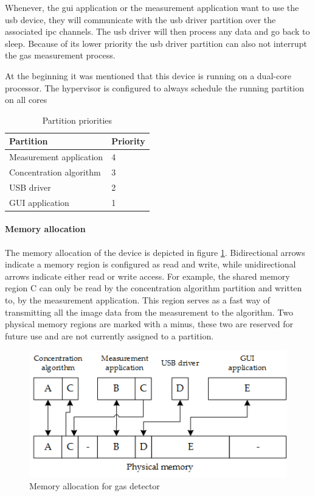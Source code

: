 Whenever, the \acrshort{gui} application or the measurement application want to use the \acrshort{usb} device, they will communicate with the \acrshort{usb} driver partition over the associated \acrshort{ipc} channels. The \acrshort{usb} driver will then process any data and go back to sleep. Because of its lower priority the \acrshort{usb} driver partition can also not interrupt the gas measurement process.

At the beginning it was mentioned that this device is running on a dual-core processor. The hypervisor is configured to always schedule the running partition on all cores 

\begin{table}[h!]
\centering
\begin{tabular}{l|l}
\textbf{Partition} & \textbf{Priority} \\ \hline
Measurement application                               & 4                                           \\ \hline
Concentration algorithm                                & 3                                           \\ \hline
USB driver                                  & 2                                           \\ \hline
GUI application                    & 1                                          
\end{tabular}
\caption{Partition priorities}
\label{table:gasdetect_priorities}
\end{table}

\paragraph{Memory allocation}
The memory allocation of the device is depicted in figure \ref{fig:gas_detect_memory_allocation}. Bidirectional arrows indicate a memory region is configured as read and write, while unidirectional arrows indicate either read or write access. For example, the shared memory region C can only be read by the concentration algorithm partition and written to, by the measurement application. This region serves as a fast way of transmitting all the image data from the measurement to the algorithm. Two physical memory regions are marked with a minus, these two are reserved for future use and are not currently assigned to a partition.

\begin{figure}[hb!]
\centering
\includegraphics[scale=0.75]{Figures/gas_detect_memory_allocation.png}
\decoRule
\caption{Memory allocation for gas detector}
\label{fig:gas_detect_memory_allocation}
\end{figure}


